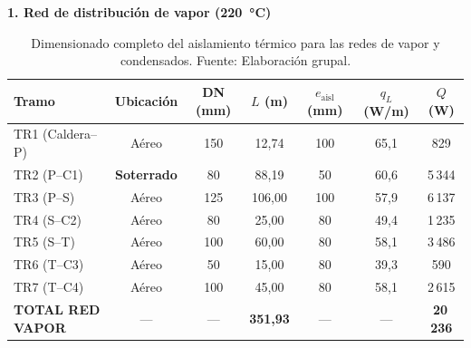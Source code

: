 \documentclass[12pt]{article}
\begin{document}
\begin{landscape}
	\begin{table}[H]
		\centering
		\small
		\caption{Dimensionado completo del aislamiento térmico para las redes de vapor y condensados. Fuente: Elaboración grupal.}

		\begin{minipage}{\linewidth}
			\begin{center}
				\textbf{1. Red de distribución de vapor (220~°C)}
			\end{center}
			\vspace{0.1cm}
			\centering
			\begin{tabular}{lcccccc}
				\toprule
				\textbf{Tramo}           & \textbf{Ubicación} & \textbf{DN (mm)} & \textbf{$L$ (m)}  & \textbf{$e_{\text{aisl}}$ (mm)} & \textbf{$q_L$ (W/m)} & \textbf{$Q$ (W)} \\
				\midrule
				TR1 (Caldera--P)         & Aéreo              & 150              & 12{,}74           & 100                             & 65{,}1               & 829              \\
				TR2 (P--C1)              & \textbf{Soterrado} & 80               & 88{,}19           & 50                              & 60{,}6               & 5\,344           \\
				TR3 (P--S)               & Aéreo              & 125              & 106{,}00          & 100                             & 57{,}9               & 6\,137           \\
				TR4 (S--C2)           & Aéreo              & 80               & 25{,}00           & 80                              & 49{,}4               & 1\,235           \\
				TR5 (S--T)               & Aéreo              & 100              & 60{,}00           & 80                              & 58{,}1               & 3\,486           \\
				TR6 (T--C3)           & Aéreo              & 50               & 15{,}00           & 80                              & 39{,}3               & 590              \\
				TR7 (T--C4)           & Aéreo              & 100              & 45{,}00           & 80                              & 58{,}1               & 2\,615           \\
				\midrule
				\textbf{TOTAL RED VAPOR} & ---                & ---              & \textbf{351{,}93} & ---                             & ---                  & \textbf{20\,236} \\
				\bottomrule
			\end{tabular}
			\label{tab:resumen_vapor_completo}
		\end{minipage}


\end{table}
\end{landscape}
\end{document}
